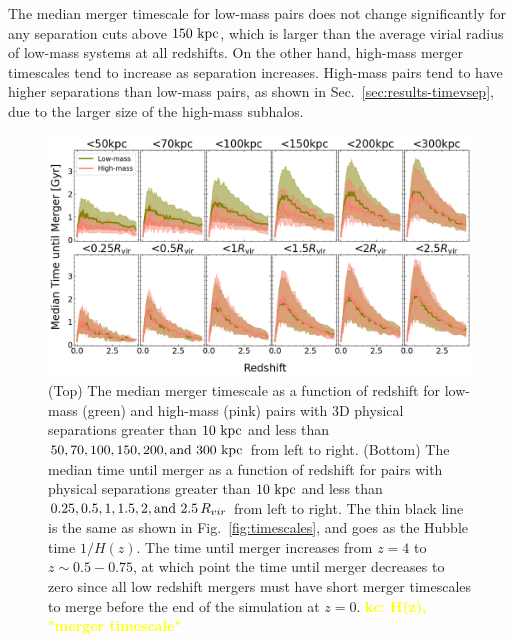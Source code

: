 \documentclass[twocolumn,linenumbers]{aastex631}
\newcommand{\kc}[1]{\textcolor{yellow}{\textbf{kc: #1}} }
\begin{document}
        The median merger timescale for low-mass pairs does not change significantly for any separation cuts above $150\,\mathrm{\,kpc}$, which is larger than the average virial radius of low-mass systems at all redshifts. 
        On the other hand, high-mass merger timescales tend to increase as separation increases.
        High-mass pairs tend to have higher separations than low-mass pairs, as shown in Sec.~\ref{sec:results-timevsep}, due to the larger size of the high-mass subhalos. 
    \begin{figure}[htb]
        \centering
        \includegraphics[width=\textwidth]{plots/bet-on-it/3_time_til_merger.png}
        \caption{(Top) The median merger timescale as a function of redshift for low-mass (green) and high-mass (pink) pairs with 3D physical separations greater than $10\,\mathrm{\,kpc}$ and less than $50,70,100,150,200,\mbox{and }300\,\mathrm{\,kpc}$ from left to right. 
        (Bottom) The median time until merger as a function of redshift for pairs with physical separations greater than $10\,\mathrm{\,kpc}$ and less than $0.25, 0.5, 1, 1.5, 2,\mbox{and }2.5\,R_{vir}$ from left to right. 
        The thin black line is the same as shown in Fig.~\ref{fig:timescales}, and goes as the Hubble time $1/H(z)$.
        The time until merger increases from $z=4$ to $z\sim0.5-0.75$, at which point the time until merger decreases to zero since all low redshift mergers must have short merger timescales to merge before the end of the simulation at $z=0$. 
        \kc{H(z), "merger timescale"}
        }
        \label{fig:timescales-sep}
    \end{figure}  
\end{document}
